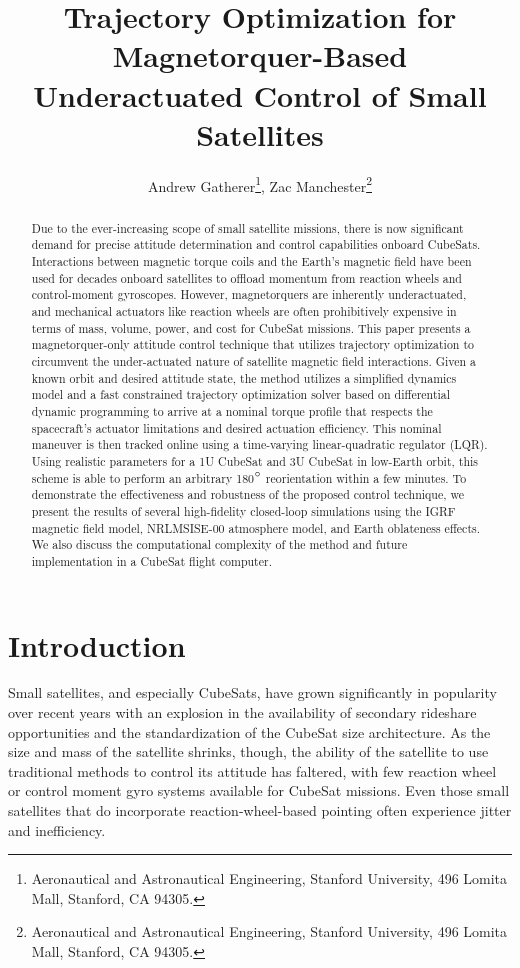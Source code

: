 \documentclass[letterpaper, preprint, paper,11pt]{IAA-AAS}	%
\begin{document}
\title{Trajectory Optimization for Magnetorquer-Based Underactuated Control of Small Satellites}

\author{Andrew Gatherer\thanks{Aeronautical and Astronautical Engineering, Stanford University, 496 Lomita Mall, Stanford, CA 94305.},  
Zac Manchester\thanks{Aeronautical and Astronautical Engineering, Stanford University, 496 Lomita Mall, Stanford, CA 94305.}}


\maketitle{} 		

\begin{abstract}
Due to the ever-increasing scope of small satellite missions, there is now significant demand for precise attitude determination and control capabilities onboard CubeSats. Interactions between magnetic torque coils and the Earth’s magnetic field have been used for decades onboard satellites to offload momentum from reaction wheels and control-moment gyroscopes. However, magnetorquers are inherently underactuated, and mechanical actuators like reaction wheels are often prohibitively expensive in terms of mass, volume, power, and cost for CubeSat missions. This paper presents a magnetorquer-only attitude control technique that utilizes trajectory optimization to circumvent the under-actuated nature of satellite magnetic field interactions. Given a known orbit and desired attitude state, the method utilizes a simplified dynamics model and a fast constrained trajectory optimization solver based on differential dynamic programming to arrive at a nominal torque profile that respects the spacecraft’s actuator limitations and desired actuation efficiency. This nominal maneuver is then tracked online using a time-varying linear-quadratic regulator (LQR). Using realistic parameters for a 1U CubeSat and 3U CubeSat in low-Earth orbit, this scheme is able to perform an arbitrary 180$\degree$ reorientation within a few minutes. To demonstrate the effectiveness and robustness of the proposed control technique, we present the results of several high-fidelity closed-loop simulations using the IGRF magnetic field model, NRLMSISE-00 atmosphere model, and Earth oblateness effects. We also discuss the computational complexity of the method and future implementation in a CubeSat flight computer.
\end{abstract}




\section{Introduction}
Small satellites, and especially CubeSats, have grown significantly in popularity over recent years with an explosion in the availability of secondary rideshare opportunities and the standardization of the CubeSat size architecture. As the size and mass of the satellite shrinks, though, the ability of the satellite to use traditional methods to control its attitude has faltered, with few reaction wheel or control moment gyro systems available for CubeSat missions. Even those small satellites that do incorporate reaction-wheel-based pointing often experience jitter and inefficiency.
\end{document}
